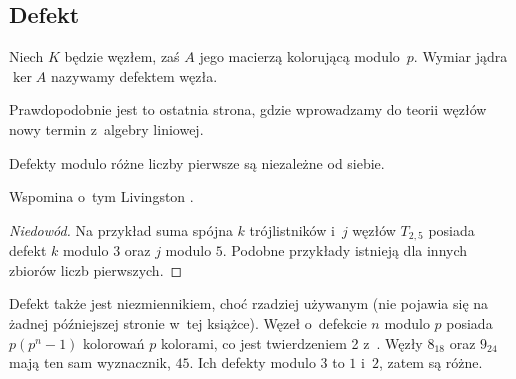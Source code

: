 %

\subsection{Defekt}
%
\begin{definition}[defekt]
    Niech $K$ będzie węzłem, zaś $A$ jego macierzą kolorującą modulo~$p$.
    Wymiar jądra $\ker A$ nazywamy defektem węzła.
\end{definition}

Prawdopodobnie jest to ostatnia strona, gdzie wprowadzamy do teorii węzłów nowy termin z~algebry liniowej.

\begin{proposition}
\label{no_relation_defects}%
    Defekty modulo różne liczby pierwsze są niezależne od siebie.
\end{proposition}

Wspomina o~tym Livingston \cite[s. 145]{livingston1993}.

\begin{proof}[Niedowód]
    Na przykład suma spójna $k$ trójlistników i~$j$ węzłów $T_{2,5}$ posiada defekt $k$ modulo $3$ oraz $j$ modulo $5$.
    Podobne przykłady istnieją dla innych zbiorów liczb pierwszych.
\end{proof}

Defekt także jest niezmiennikiem, choć rzadziej używanym (nie pojawia się na żadnej późniejszej stronie w~tej książce).
Węzeł o~defekcie $n$ modulo $p$ posiada $p(p^n-1)$ kolorowań $p$ kolorami, co jest twierdzeniem 2 z~\cite{taalman2005}.
Węzły $8_{18}$ oraz $9_{24}$ mają ten sam wyznacznik, $45$.
Ich defekty modulo $3$ to $1$ i~$2$, zatem są różne.
%

%